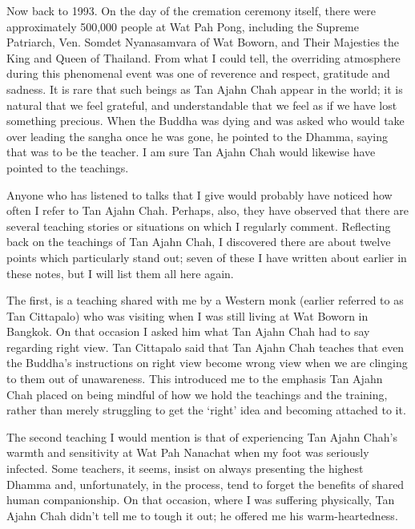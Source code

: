 Now back to 1993. On the day of the cremation ceremony itself, there
were approximately 500,000 people\cite{cremation}
at Wat Pah Pong, including the Supreme Patriarch, Ven.
Somdet Nyanasamvara of Wat Boworn, and Their Majesties the King and
Queen of Thailand. From what I could tell, the \mbox{overriding} atmosphere
during this phenomenal event was one of reverence and respect, gratitude
and sadness. It is rare that such beings as Tan Ajahn Chah appear in the
world; it is natural that we feel grateful, and understandable that we
feel as if we have lost something precious. When the Buddha was dying
and was asked who would take over leading the sangha once he was gone,
he pointed to the Dhamma, saying that was to be the teacher. I am sure
Tan Ajahn Chah would likewise have pointed to the teachings.

Anyone who has listened to talks that I give\cite{talks}
would probably have noticed how often I refer to
Tan Ajahn Chah. Perhaps, also, they have observed that there are several
teaching stories or situations on which I regularly comment. Reflecting
back on the teachings of Tan Ajahn Chah, I discovered there are about
twelve points which particularly stand out; seven of these I have
written about earlier in these notes, but I will list them all here
again.

The first, is a teaching shared with me by a Western monk (earlier referred to
as Tan Cittapalo) who was visiting when I was still living at Wat Boworn in
Bangkok.
On that occasion I asked him what
Tan Ajahn Chah had to say regarding right view. Tan Cittapalo said that
Tan Ajahn Chah teaches that even the Buddha's instructions on right view
become wrong view when we are clinging to them out of unawareness. This
introduced me to the emphasis Tan Ajahn Chah placed on being mindful of
how we hold the teachings and the training, rather than merely
struggling to get the `right' idea and becoming attached to it.

The second teaching I would mention is that of experiencing Tan Ajahn
Chah's warmth and sensitivity at Wat Pah Nanachat when my foot was
seriously infected. Some teachers, it seems, insist on always presenting
the highest Dhamma and, unfortunately, in the process, tend to forget
the benefits of shared human companionship. On that occasion, where I
was suffering physically, Tan Ajahn Chah didn't tell me to tough it out;
he offered me his warm-heartedness.

